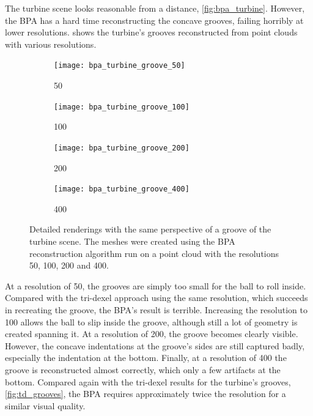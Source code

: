 The turbine scene looks reasonable from a distance, \cf \cref{fig:bpa_turbine}.
However, the BPA has a hard time reconstructing the concave grooves, failing horribly at lower resolutions.
 shows the turbine's grooves reconstructed from point clouds with various resolutions.
%
\begin{figure}
	\centering
	\begin{subfigure}[b]{0.24\textwidth}
		\centering
		\texttt{[image: bpa\_turbine\_groove\_50]}
		\caption{50}
		\label{fig:bpa_turbine_groove_50}
	\end{subfigure}
	\begin{subfigure}[b]{0.24\textwidth}
		\centering
		\texttt{[image: bpa\_turbine\_groove\_100]}
		\caption{100}
		\label{fig:bpa_turbine_groove_100}
	\end{subfigure}
	\begin{subfigure}[b]{0.24\textwidth}
		\centering
		\texttt{[image: bpa\_turbine\_groove\_200]}
		\caption{200}
		\label{fig:bpa_turbine_groove_200}
	\end{subfigure}
	\begin{subfigure}[b]{0.24\textwidth}
		\centering
		\texttt{[image: bpa\_turbine\_groove\_400]}
		\caption{400}
		\label{fig:bpa_turbine_groove_400}
	\end{subfigure}
	\caption{
		Detailed renderings with the same perspective of a groove of the turbine scene.
		The meshes were created using the BPA reconstruction algorithm run on a point cloud with the resolutions 50, 100, 200 and 400.
	}
	\label{fig:bpa_grooves}
\end{figure}
%
At a resolution of 50, the grooves are simply too small for the ball to roll inside.
Compared with the tri-dexel approach using the same resolution, which succeeds in recreating the groove, the BPA's result is terrible.
Increasing the resolution to 100 allows the ball to slip inside the groove, although still a lot of geometry is created spanning it.
At a resolution of 200, the groove becomes clearly visible.
However, the concave indentations at the groove's sides are still captured badly, especially the indentation at the bottom.
Finally, at a resolution of 400 the groove is reconstructed almost correctly, which only a few artifacts at the bottom.
Compared again with the tri-dexel results for the turbine's grooves, \cf \cref{fig:td_grooves}, the BPA requires approximately twice the resolution for a similar visual quality.

